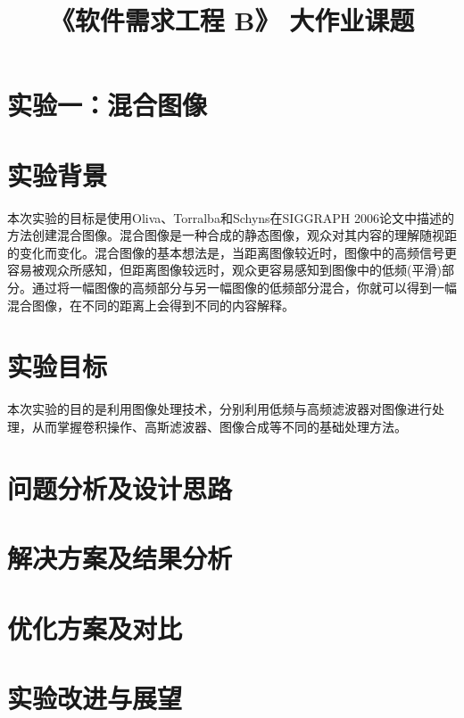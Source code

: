\documentclass[withoutpreface,bwprint]{cumcmthesis} %
\title{《软件需求工程 B》 大作业课题}
\begin{document}

\newpage
 
%  

\section*{\LARGE 实验一：混合图像}

\section{实验背景}

本次实验的目标是使用Oliva、Torralba和Schyns在SIGGRAPH 2006论文中描述的方法创建混合图像。混合图像是一种合成的静态图像，观众对其内容的理解随视距的变化而变化。混合图像的基本想法是，当距离图像较近时，图像中的高频信号更容易被观众所感知，但距离图像较远时，观众更容易感知到图像中的低频(平滑)部分。通过将一幅图像的高频部分与另一幅图像的低频部分混合，你就可以得到一幅混合图像，在不同的距离上会得到不同的内容解释。
\section{实验目标}
本次实验的目的是利用图像处理技术，分别利用低频与高频滤波器对图像进行处理，从而掌握卷积操作、高斯滤波器、图像合成等不同的基础处理方法。

\section{问题分析及设计思路}


\section{解决方案及结果分析}

\section{优化方案及对比}


\section{实验改进与展望}
\end{document}
